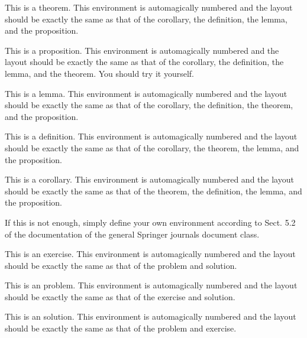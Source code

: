 \documentclass[dc]{svjour}
\begin{document}
\begin{theorem}
This is a theorem. This environment is automagically numbered  and the
layout should be exactly the same as that of the corollary, the
definition, the lemma, and the proposition.
\end{theorem}

\begin{proposition}
This is a proposition. This environment is automagically numbered  and the
layout should be exactly the same as that of the corollary, the
definition, the lemma, and the theorem. You should try it yourself.
\end{proposition}

\begin{lemma}
This is a lemma. This environment is automagically numbered  and the
layout should be exactly the same as that of the corollary, the
definition, the theorem, and the proposition.
\end{lemma}

\begin{definition}
This is a definition. This environment is automagically numbered  and the
layout should be exactly the same as that of the corollary, the
theorem, the lemma, and the proposition.
\end{definition}

\begin{corollary}
This is a corollary. This environment is automagically numbered  and the
layout should be exactly the same as that of the theorem, the
definition, the lemma, and the proposition.
\end{corollary}

If this is not enough, simply define your own environment according to
Sect. 5.2 of the documentation of the general Springer journals document class.

\begin{exercise}
This is an exercise. This environment is automagically numbered  and the
layout should be exactly the same as that of the problem and solution.
\end{exercise}

\begin{problem}
This is an problem. This environment is automagically numbered  and the
layout should be exactly the same as that of the exercise and solution.
\end{problem}

\begin{solution}
This is an solution. This environment is automagically numbered  and the
layout should be exactly the same as that of the problem and exercise.
\end{solution}
\end{document}
